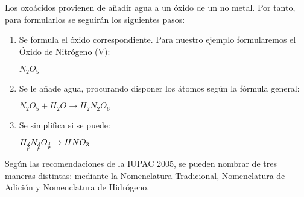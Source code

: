 Los oxoácidos provienen de añadir agua a un óxido de un no metal. Por tanto, para formularlos se seguirán los siguientes pasos:\\
\begin{enumerate}
	\item Se formula el óxido correspondiente. Para nuestro ejemplo formularemos el Óxido de Nitrógeno (V):
	\begin{center}
		$N_{2}O_5$
	\end{center}
	\item Se le añade agua, procurando disponer los átomos según la fórmula general:
	\begin{center}
		$N_{2}O_5+ H_{2}O \rightarrow H_{2}N_{2}O_6$	
	\end{center}
	\item Se simplifica si se puede:
	\begin{center}
		$H_{\cancel{2}}N_{\cancel{2}}O_{\cancel{6}} \rightarrow HNO_3$
	\end{center}
\end{enumerate}
Según las recomendaciones de la IUPAC 2005, se pueden nombrar de tres maneras distintas: mediante la Nomenclatura Tradicional, Nomenclatura de Adición y Nomenclatura de Hidrógeno.\\
